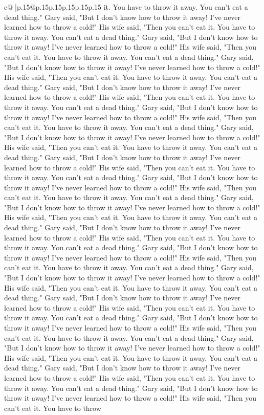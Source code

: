 \documentclass{article}
\begin{document}
{\begin{supertabular}{c@{$\;$}|p{.15\linewidth}@{}p{.15\linewidth}p{.15\linewidth}p{.15\linewidth}p{.15\linewidth}p{.15\linewidth}}
{{{it. You have to throw it away. You can't eat a dead thing." Gary said, "But I don't know how to throw it away! I've never learned how to throw a cold!" His wife said, "Then you can't eat it. You have to throw it away. You can't eat a dead thing." Gary said, "But I don't know how to throw it away! I've never learned how to throw a cold!" His wife said, "Then you can't eat it. You have to throw it away. You can't eat a dead thing." Gary said, "But I don't know how to throw it away! I've never learned how to throw a cold!" His wife said, "Then you can't eat it. You have to throw it away. You can't eat a dead thing." Gary said, "But I don't know how to throw it away! I've never learned how to throw a cold!" His wife said, "Then you can't eat it. You have to throw it away. You can't eat a dead thing." Gary said, "But I don't know how to throw it away! I've never learned how to throw a cold!" His wife said, "Then you can't eat it. You have to throw it away. You can't eat a dead thing." Gary said, "But I don't know how to throw it away! I've never learned how to throw a cold!" His wife said, "Then you can't eat it. You have to throw it away. You can't eat a dead thing." Gary said, "But I don't know how to throw it away! I've never learned how to throw a cold!" His wife said, "Then you can't eat it. You have to throw it away. You can't eat a dead thing." Gary said, "But I don't know how to throw it away! I've never learned how to throw a cold!" His wife said, "Then you can't eat it. You have to throw it away. You can't eat a dead thing." Gary said, "But I don't know how to throw it away! I've never learned how to throw a cold!" His wife said, "Then you can't eat it. You have to throw it away. You can't eat a dead thing." Gary said, "But I don't know how to throw it away! I've never learned how to throw a cold!" His wife said, "Then you can't eat it. You have to throw it away. You can't eat a dead thing." Gary said, "But I don't know how to throw it away! I've never learned how to throw a cold!" His wife said, "Then you can't eat it. You have to throw it away. You can't eat a dead thing." Gary said, "But I don't know how to throw it away! I've never learned how to throw a cold!" His wife said, "Then you can't eat it. You have to throw it away. You can't eat a dead thing." Gary said, "But I don't know how to throw it away! I've never learned how to throw a cold!" His wife said, "Then you can't eat it. You have to throw it away. You can't eat a dead thing." Gary said, "But I don't know how to throw it away! I've never learned how to throw a cold!" His wife said, "Then you can't eat it. You have to throw it away. You can't eat a dead thing." Gary said, "But I don't know how to throw it away! I've never learned how to throw a cold!" His wife said, "Then you can't eat it. You have to throw it away. You can't eat a dead thing." Gary said, "But I don't know how to throw it away! I've never learned how to throw a cold!" His wife said, "Then you can't eat it. You have to throw it away. You can't eat a dead thing." Gary said, "But I don't know how to throw it away! I've never learned how to throw a cold!" His wife said, "Then you can't eat it. You have to throw }}}
\end{supertabular}}
\end{document}
